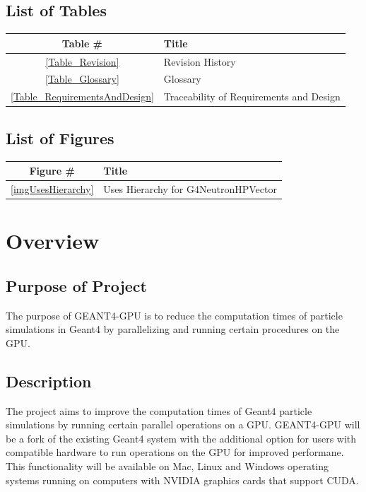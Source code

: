 \documentclass[12pt]{article}
\begin{document}
\subsection{List of Tables}
\begin{center}
\begin{tabular}{cl}
\toprule
\bf Table \# & \bf Title\\\midrule
\ref{Table_Revision} & Revision History\\
\ref{Table_Glossary} & Glossary\\
\ref{Table_RequirementsAndDesign} & Traceability of Requirements and Design\\
\bottomrule
\end{tabular}
\end{center}

\subsection{List of Figures}
\begin{center}
\begin{tabular}{cl}
\toprule
\bf Figure \# & \bf Title\\\midrule
\ref{imgUsesHierarchy} & Uses Hierarchy for G4NeutronHPVector\\
\bottomrule
\end{tabular}
\end{center}

\section{Overview}
\subsection{Purpose of Project}
The purpose of GEANT4-GPU is to reduce the computation times of particle simulations in Geant4 by parallelizing and running certain procedures on the GPU.

\subsection{Description}
The project aims to improve the computation times of Geant4 particle simulations by running certain parallel operations on a GPU. GEANT4-GPU will be a fork of the existing Geant4 system with the additional option for users with compatible hardware to run operations on the GPU for improved performane. This functionality will be available on Mac, Linux and Windows operating systems running on computers with NVIDIA graphics cards that support CUDA.\\
\end{document}
